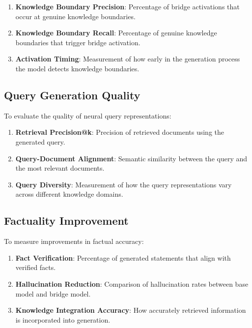 \documentclass[9pt,a4paper,twocolumn,twoside]{tau-class/tau}
\begin{document}
    \begin{enumerate}
        \item \textbf{Knowledge Boundary Precision}: Percentage of bridge activations that occur at genuine knowledge boundaries.
        \item \textbf{Knowledge Boundary Recall}: Percentage of genuine knowledge boundaries that trigger bridge activation.
        \item \textbf{Activation Timing}: Measurement of how early in the generation process the model detects knowledge boundaries.
    \end{enumerate}

\subsection{Query Generation Quality}

    To evaluate the quality of neural query representations:

    \begin{enumerate}
        \item \textbf{Retrieval Precision@k}: Precision of retrieved documents using the generated query.
        \item \textbf{Query-Document Alignment}: Semantic similarity between the query and the most relevant documents.
        \item \textbf{Query Diversity}: Measurement of how the query representations vary across different knowledge domains.
    \end{enumerate}

\subsection{Factuality Improvement}

    To measure improvements in factual accuracy:

    \begin{enumerate}
        \item \textbf{Fact Verification}: Percentage of generated statements that align with verified facts.
        \item \textbf{Hallucination Reduction}: Comparison of hallucination rates between base model and bridge model.
        \item \textbf{Knowledge Integration Accuracy}: How accurately retrieved information is incorporated into generation.
    \end{enumerate}
\end{document}
